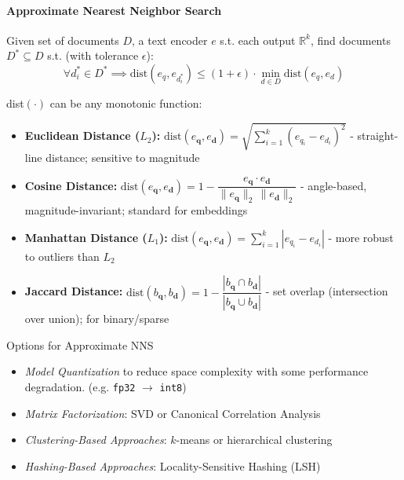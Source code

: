 \documentclass{article}
\begin{document}
\paragraph{Approximate Nearest Neighbor Search}
Given set of documents $D$, a text encoder $e$ s.t. each output $\mathbb{R}^k$, find documents $D^* \subseteq D$ s.t. (with tolerance $\epsilon$):
$$
\forall d_i^* \in D^* \implies \text{dist}(e_q, e_{d^*_i})\leq (1+ \epsilon) \cdot \min_{d \in D} \text{dist}(e_q, e_d)
$$

dist$(\cdot)$ can be any monotonic function:
\begin{itemize}
    \item \textbf{Euclidean Distance ($L_2$):} $\text{dist}(e_{\mathbf{q}}, e_{\mathbf{d}}) = \sqrt{\sum_{i=1}^{k} \left(e_{q_i} - e_{d_i}\right)^2}$ - straight-line distance; sensitive to magnitude
    \item \textbf{Cosine Distance:} $\text{dist}(e_{\mathbf{q}}, e_{\mathbf{d}}) = 1 - \dfrac{e_{\mathbf{q}} \cdot e_{\mathbf{d}}}{\|e_{\mathbf{q}}\|_2 \, \|e_{\mathbf{d}}\|_2}$ - angle-based, magnitude-invariant; standard for embeddings
    \item \textbf{Manhattan Distance ($L_1$):} $\text{dist}(e_{\mathbf{q}}, e_{\mathbf{d}}) = \sum_{i=1}^{k} |e_{q_i} - e_{d_i}|$ - more robust to outliers than $L_2$
    \item \textbf{Jaccard Distance:} $\text{dist}(b_{\mathbf{q}}, b_{\mathbf{d}}) = 1 - \dfrac{|b_{\mathbf{q}} \cap b_{\mathbf{d}}|}{|b_{\mathbf{q}} \cup b_{\mathbf{d}}|}$ - set overlap (intersection over union); for binary/sparse
\end{itemize}

Options for Approximate NNS
\begin{itemize}
    \item \textit{Model Quantization} to reduce space complexity with some performance degradation. (e.g. \verb|fp32| $\rightarrow$ \verb|int8|)
    \item \textit{Matrix Factorization}: SVD or Canonical Correlation Analysis
    \item \textit{Clustering-Based Approaches}: $k$-means or hierarchical clustering
    \item \textit{Hashing-Based Approaches}: Locality-Sensitive Hashing (LSH)
\end{itemize}
\end{document}
